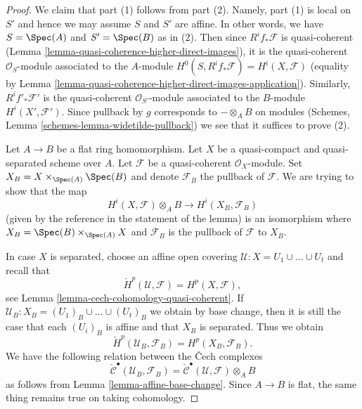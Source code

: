 \begin{proof}
We claim that part (1) follows from part (2). Namely,
part (1) is local on $S'$ and hence we may assume $S$
and $S'$ are affine. In other words, we have $S = \Spec(A)$
and $S' = \Spec(B)$ as in (2).
Then since $R^if_*\mathcal{F}$ is quasi-coherent
(Lemma \ref{lemma-quasi-coherence-higher-direct-images}),
it is the quasi-coherent $\mathcal{O}_S$-module associated to the
$A$-module $H^0(S, R^if_*\mathcal{F}) = H^i(X, \mathcal{F})$
(equality by
Lemma \ref{lemma-quasi-coherence-higher-direct-images-application}).
Similarly, $R^if'_*\mathcal{F}'$ is the quasi-coherent
$\mathcal{O}_{S'}$-module associated to the $B$-module
$H^i(X', \mathcal{F}')$. Since pullback by $g$ corresponds
to $- \otimes_A B$ on modules
(Schemes, Lemma \ref{schemes-lemma-widetilde-pullback})
we see that it suffices to prove (2).

\medskip\noindent
Let $A \to B$ be a flat ring homomorphism.
Let $X$ be a quasi-compact and quasi-separated scheme over $A$.
Let $\mathcal{F}$ be a quasi-coherent $\mathcal{O}_X$-module.
Set $X_B = X \times_{\Spec(A)} \Spec(B)$ and denote
$\mathcal{F}_B$ the pullback of $\mathcal{F}$.
We are trying to show that the map
$$
H^i(X, \mathcal{F}) \otimes_A B \longrightarrow H^i(X_B, \mathcal{F}_B)
$$
(given by the reference in the statement of the lemma)
is an isomorphism where $X_B = \Spec(B) \times_{\Spec(A)} X$ and
$\mathcal{F}_B$ is the pullback of $\mathcal{F}$ to $X_B$.

\medskip\noindent
In case $X$ is separated, choose an affine open covering
$\mathcal{U} : X = U_1 \cup \ldots \cup U_t$ and recall that
$$
\check{H}^p(\mathcal{U}, \mathcal{F}) = H^p(X, \mathcal{F}),
$$
see
Lemma \ref{lemma-cech-cohomology-quasi-coherent}.
If $\mathcal{U}_B : X_B = (U_1)_B \cup \ldots \cup (U_t)_B$ we obtain
by base change, then it is still the case that each $(U_i)_B$ is affine
and that $X_B$ is separated. Thus we obtain
$$
\check{H}^p(\mathcal{U}_B, \mathcal{F}_B) = H^p(X_B, \mathcal{F}_B).
$$
We have the following relation between the {\v C}ech complexes
$$
\check{\mathcal{C}}^\bullet(\mathcal{U}_B, \mathcal{F}_B) =
\check{\mathcal{C}}^\bullet(\mathcal{U}, \mathcal{F}) \otimes_A B
$$
as follows from
Lemma \ref{lemma-affine-base-change}.
Since $A \to B$ is flat, the same thing remains true on taking cohomology.


\end{proof}
